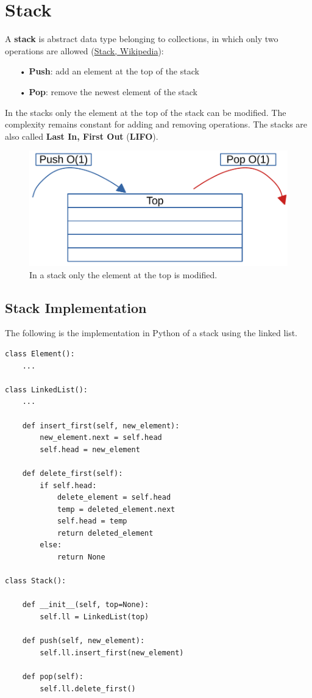 \section{Stack}
\label{stack}
A \textbf{stack} is abstract data type belonging to collections, in which only two operations are allowed \cite{wikistack} (\href{https://en.wikipedia.org/wiki/Stack_(abstract_data_type)}{Stack, Wikipedia}):
\begin{itemize}
\item[•] \textbf{Push}: add an element at the top of the stack
\item[•] \textbf{Pop}: remove the newest element of the stack
\end{itemize}
In the stacks only the element at the top of the stack can be modified. The complexity remains constant for adding and removing operations. The stacks are also called \textbf{Last In, First Out} (\textbf{LIFO}).
\begin{figure}[H]
	\begin{center}
		\includegraphics[scale=.6]{chapters/datastructures/images/stack_1.pdf}
		\caption[In a stack only the element at the top is modified.]{In a stack only the element at the top is modified.}
		\label{stack_1}
	\end{center}
\end{figure}
\subsection{Stack Implementation}
The following is the implementation in Python of a stack using the linked list.
\begin{lstlisting}[firstnumber=1, caption={Stack implementation.}]
class Element():
	...

class LinkedList():
	...
	
	def insert_first(self, new_element):
		new_element.next = self.head
		self.head = new_element
	
	def delete_first(self):
		if self.head:
			delete_element = self.head
			temp = deleted_element.next
			self.head = temp
			return deleted_element
		else:
			return None

class Stack():
	
	def __init__(self, top=None):
		self.ll = LinkedList(top)
		
	def push(self, new_element):
		self.ll.insert_first(new_element)
	
	def pop(self):
		self.ll.delete_first()
\end{lstlisting}

